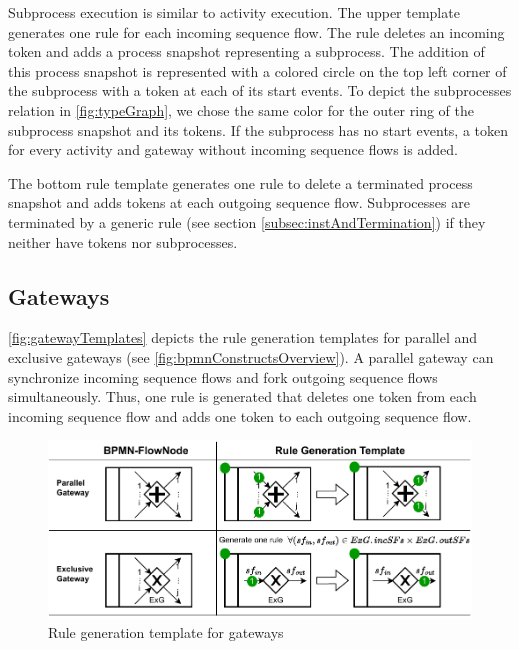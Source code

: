 \documentclass[submission, copyright, creativecommons]{eptcs}
\begin{document}
Subprocess execution is similar to activity execution.
The upper template generates one rule for each incoming sequence flow.
The rule deletes an incoming token and adds a process snapshot representing a subprocess. 
The addition of this process snapshot is represented with a colored circle on the top left corner of the subprocess with a token at each of its start events.
To depict the \textsf{subprocesses} relation in \autoref{fig:typeGraph}, we chose the same color for the outer ring of the subprocess snapshot and its tokens.
If the subprocess has no start events, a token for every activity and gateway without incoming sequence flows is added. %

The bottom rule template generates one rule to delete a terminated process snapshot and adds tokens at each outgoing sequence flow.
Subprocesses are terminated by a generic rule (see section \ref{subsec:instAndTermination}) if they neither have tokens nor subprocesses.


\subsection{Gateways}
\autoref{fig:gatewayTemplates} depicts the rule generation templates for parallel and exclusive gateways (see \cref{fig:bpmnConstructsOverview}).
A parallel gateway can synchronize incoming sequence flows and fork outgoing sequence flows simultaneously.
Thus, one rule is generated that deletes one token from each incoming sequence flow and adds one token to each outgoing sequence flow.

\begin{figure}[h]
    \centering
    \includegraphics[width=1\textwidth]{images/gateways_template.pdf}
    \caption{Rule generation template for gateways}
    \label{fig:gatewayTemplates}
\end{figure}
\end{document}
